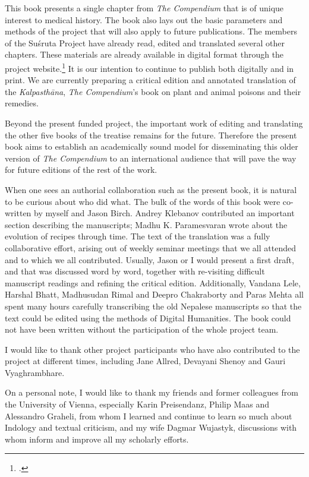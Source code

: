 This book presents a single chapter from \emph{The Compendium} that is of
unique interest to medical history.  The book also lays out the basic
parameters and methods of the project that will also apply to future
publications. The members of the Suśruta Project have already read, edited and
translated several other chapters.  These materials are already available in
digital format through the project website.\footcite{wuja-2021b} It is our
intention to continue to publish both digitally and in print.  We are
currently preparing a critical edition and annotated translation of the
\emph{Kalpasthāna}, \emph{The Compendium}'s book on plant and animal poisons
and their remedies.

Beyond the present funded project, the important work of editing and
translating the other five books of the treatise remains for the future.
Therefore the present book aims to establish an academically sound model for
disseminating this older version of \emph{The Compendium} to an international
audience that will pave the way for future editions of the rest of the work.

When one sees an authorial collaboration such as the present book, it is
natural to be curious about who did what.  The bulk of the words of this
book were co-written by myself and Jason Birch.  Andrey Klebanov contributed
an important section describing the manuscripts; Madhu K. Paramesvaran wrote
about the evolution of recipes through time. The text of the translation was
a fully collaborative effort, arising out of weekly seminar meetings that we
all attended and to which we all contributed. Usually, Jason or I would
present a first draft, and that was discussed word by word, together with
re-visiting difficult manuscript readings and refining the critical edition.
Additionally, Vandana Lele, Harshal Bhatt, Madhusudan Rimal and Deepro
Chakraborty and Paras Mehta all spent many hours carefully transcribing the
old Nepalese manuscripts so that the text could be edited using the methods
of Digital Humanities.  The book could not have been written without the
participation of the whole project team.

I would like to thank other project participants who have also contributed to
the project at different times, including Jane Allred, Devayani Shenoy and
Gauri Vyaghrambhare.  

On a personal note, I would like to thank my friends and former colleagues 
from the University of Vienna, especially Karin Preisendanz, Philip Maas and
Alessandro Graheli, from whom I learned and continue to learn so much about
Indology and textual criticism, and my wife Dagmar Wujastyk, discussions with
whom inform and improve all my scholarly efforts.

